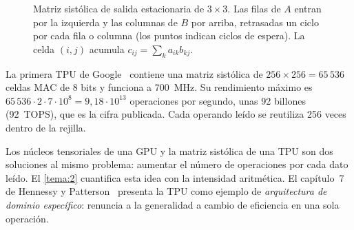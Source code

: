 \begin{figure}[h]
\centering
{}
\caption{Matriz sistólica de salida estacionaria de $3\times 3$. Las filas de $A$ entran por la izquierda y las columnas de $B$ por arriba, retrasadas un ciclo por cada fila o columna (los puntos indican ciclos de espera). La celda $(i,j)$ acumula $c_{ij}=\sum_k a_{ik}b_{kj}$.}
\label{fig:sistolica}
\end{figure}

\begin{ejemplo}[TPU v1]\label{ej:tpu}
La primera TPU de Google~\cite{jouppi} contiene una matriz sistólica de $256\times 256=65\,536$ celdas MAC de 8 bits y funciona a 700~MHz. Su rendimiento máximo es $65\,536\cdot 2\cdot 7\cdot 10^{8}=9{,}18\cdot 10^{13}$ operaciones por segundo, unas 92 billones (92~TOPS), que es la cifra publicada. Cada operando leído se reutiliza 256 veces dentro de la rejilla.
\end{ejemplo}

\begin{observacion}
Los núcleos tensoriales de una GPU y la matriz sistólica de una TPU son dos soluciones al mismo problema: aumentar el número de operaciones por cada dato leído. El \cref{tema:2} cuantifica esta idea con la intensidad aritmética. El capítulo~7 de Hennessy y Patterson~\cite{hp} presenta la TPU como ejemplo de \emph{arquitectura de dominio específico}: renuncia a la generalidad a cambio de eficiencia en una sola operación.
\end{observacion}

